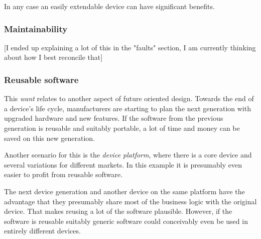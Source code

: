 In any case an easily extendable device can have significant benefits.
\subsubsection{Maintainability}
[I ended up explaining a lot of this in the "faults" section, I am currently thinking about how I best reconcile that]
\subsubsection{Reusable software}
This \textit{want} relates to another aspect of future oriented design. Towards the end of a device's life cycle, manufacturers are starting to plan the next generation with upgraded hardware and new features. If the software from the previous generation is reusable and suitably portable, a lot of time and money can be saved on this new generation.

Another scenario for this is the \textit{device platform}, where there is a core device and several variations for different markets. In this example it is presumably even easier to profit from reusable software.

The next device generation and another device on the same platform have the advantage that they presumably share most of the business logic with the original device. That makes reusing a lot of the software plausible. However, if the software is reusable suitably generic software could conceivably even be used in entirely different devices.
